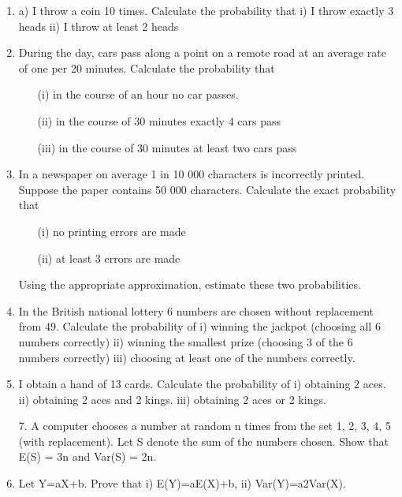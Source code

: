 \documentclass[]{report}
\begin{document}
\begin{enumerate}	
\item a) I throw a coin 10 times. Calculate the probability that 
	i) I throw exactly 3 heads
	ii) I throw at least 2 heads
	


	
\item During the day, cars pass along a point on a remote road at an average rate of one per 20 minutes. Calculate the probability that 
\begin{itemize}
	\item[(i)]	in the course of an hour no car passes. 
	\item[(ii)]	in the course of 30 minutes exactly 4 cars pass
	\item[(iii)]	in the course of 30 minutes at least two cars pass
\end{itemize}


\item	In a newspaper on average 1 in 10 000 characters is incorrectly printed. Suppose the paper contains 50 000 characters. Calculate the exact probability that 
 \begin{itemize}
\item[(i)]	no printing errors are made
\item[(ii)]	at least 3 errors are made
 \end{itemize}	
	Using the appropriate approximation, estimate these two probabilities. 
\item In the British national lottery 6 numbers are chosen without replacement from 49. Calculate the probability of 
	i)	winning the jackpot (choosing all 6 numbers correctly)
	ii)	winning the smallest prize (choosing 3 of the 6 numbers correctly)
	iii)	choosing at least one of the numbers correctly.
	
\item	I obtain a hand of 13 cards. Calculate the probability of
	i) obtaining 2 aces.
	ii) obtaining 2 aces and 2 kings.
	iii) obtaining 2 aces or 2 kings.
	
	7.  A computer chooses a number at random n times from the set {1, 2, 3, 4, 5} (with replacement). Let S denote the sum of the numbers chosen. Show that
	E(S) = 3n and Var(S) = 2n.
	
\item	Let Y=aX+b. Prove that i) E(Y)=aE(X)+b, ii) Var(Y)=a2Var(X).
	

\end{enumerate}
\end{document}
